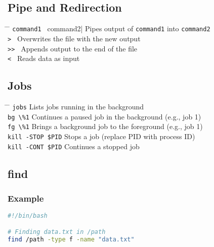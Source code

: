 \documentclass[a4paper,10pt]{article}
\begin{document}
\subsection{Pipe and Redirection}
\begin{tabbing}
	\= \hspace{60mm} \= \hspace{80mm} \kill
	\> \verb|command1 | command2| \> Pipes output of \verb|command1| into \verb|command2| \\
	\> \verb|> | \> Overwrites the file with the new output \\
	\> \verb|>> | \> Appends output to the end of the file \\
	\> \verb|< | \> Reads data as input \\
\end{tabbing}

\subsection{Jobs}
\begin{tabbing}
	\= \hspace{60mm} \= \hspace{80mm} \kill
	\> \verb|jobs| \> Lists jobs running in the background \\
	\> \verb|bg \%1| \> Continues a paused job in the background (e.g., job 1) \\
	\> \verb|fg \%1| \> Brings a background job to the foreground (e.g., job 1) \\
	\> \verb|kill -STOP $PID| \> Stops a job (replace PID with process ID) \\
	\> \verb|kill -CONT $PID| \> Continues a stopped job \\
\end{tabbing}

\subsection{find}
\subsubsection*{Example}
\begin{lstlisting}[language=bash]
#!/bin/bash

# Finding data.txt in /path
find /path -type f -name "data.txt"
\end{lstlisting}
\end{document}
